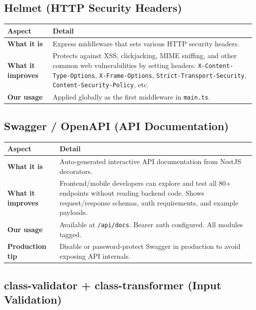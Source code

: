 \documentclass[a4paper,11pt]{article}
\begin{document}
\subsection{Helmet (HTTP Security Headers)}

\begin{longtable}{L{3.5cm} L{11.5cm}}
\toprule
\textbf{Aspect} & \textbf{Detail} \\
\midrule
\endhead
\textbf{What it is} & Express middleware that sets various HTTP security headers. \\
\midrule
\textbf{What it improves} & Protects against XSS, clickjacking, MIME sniffing, and other common web vulnerabilities by setting headers: \texttt{X-Content-Type-Options}, \texttt{X-Frame-Options}, \texttt{Strict-Transport-Security}, \texttt{Content-Security-Policy}, etc. \\
\midrule
\textbf{Our usage} & Applied globally as the first middleware in \texttt{main.ts}. \\
\bottomrule
\end{longtable}

\subsection{Swagger / OpenAPI (API Documentation)}

\begin{longtable}{L{3.5cm} L{11.5cm}}
\toprule
\textbf{Aspect} & \textbf{Detail} \\
\midrule
\endhead
\textbf{What it is} & Auto-generated interactive API documentation from NestJS decorators. \\
\midrule
\textbf{What it improves} & Frontend/mobile developers can explore and test all 80+ endpoints without reading backend code. Shows request/response schemas, auth requirements, and example payloads. \\
\midrule
\textbf{Our usage} & Available at \texttt{/api/docs}. Bearer auth configured. All modules tagged. \\
\midrule
\textbf{Production tip} & Disable or password-protect Swagger in production to avoid exposing API internals. \\
\bottomrule
\end{longtable}

\subsection{class-validator + class-transformer (Input Validation)}
\end{document}
